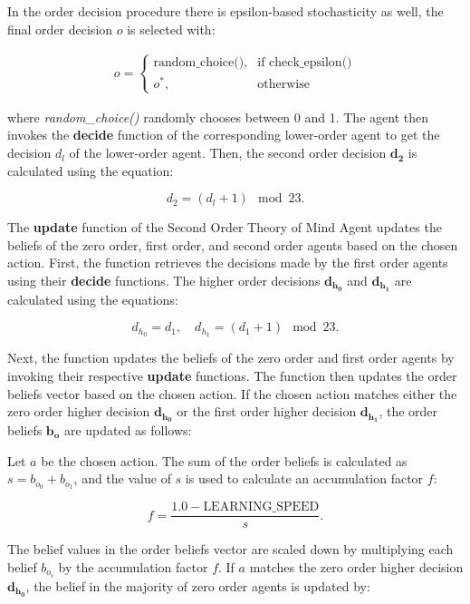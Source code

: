 In the order decision procedure there is epsilon-based stochasticity as well, the final order decision $o$ is selected with:

\[
\begin{aligned}
\text{{$o$}} =
\begin{cases}
\text{{random\_choice()}}, & \text{{if }} \text{{check\_epsilon()}} \\
o^*, & \text{{otherwise}}
\end{cases}
\end{aligned}
\]

where \textit{random\_choice()} randomly chooses between 0 and 1. The agent then invokes the \textbf{decide} function of the corresponding lower-order agent to get the decision $d_l$ of the lower-order agent. Then, the second order decision $\mathbf{d_2}$  is calculated using the equation:

\label{eq:second-order-decide}
\[
d_2 = (d_l + 1) \mod 23.
\]


The \textbf{update} function of the Second Order Theory of Mind Agent updates the beliefs of the zero order, first order, and second order agents based on the chosen action. First, the function retrieves the decisions made by the first order agents using their \textbf{decide} functions. The higher order decisions $\mathbf{d_{h_0}}$ and $\mathbf{d_{h_1}}$ are calculated using the equations:

\[
d_{h_0} = d_1, \quad d_{h_1} = (d_1 + 1) \mod 23.
\]

Next, the function updates the beliefs of the zero order and first order agents by invoking their respective \textbf{update} functions. The function then updates the order beliefs vector based on the chosen action. If the chosen action matches either the zero order higher decision $\mathbf{d_{h_0}}$ or the first order higher decision $\mathbf{d_{h_1}}$, the order beliefs $\mathbf{b_o}$ are updated as follows:

Let $a$ be the chosen action. The sum of the order beliefs is calculated as $s = b_{o_0} + b_{o_1}$, and the value of $s$ is used to calculate an accumulation factor $f$:

\[
f = \frac{{1.0 - \text{{LEARNING\_SPEED}}}}{s}.
\]

The belief values in the order beliefs vector are scaled down by multiplying each belief $b_{o_i}$ by the accumulation factor $f$. If $a$ matches the zero order higher decision $\mathbf{d_{h_0}}$, the belief in the majority of zero order agents is updated by:

